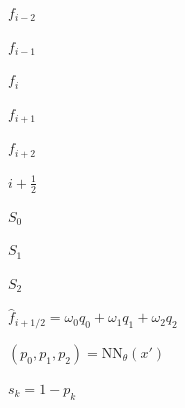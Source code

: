 \documentclass{article}
\begin{document}
\begin{preview}
\hbox{
\color[HTML]{242424}
\fontsize{23}{27.60}\selectfont
$\displaystyle f_{i-2}$
}
\end{preview}
\begin{preview}
\hbox{
\color[HTML]{242424}
\fontsize{23}{27.60}\selectfont
$\displaystyle f_{i-1}$
}
\end{preview}
\begin{preview}
\hbox{
\color[HTML]{242424}
\fontsize{23}{27.60}\selectfont
$\displaystyle f_i$
}
\end{preview}
\begin{preview}
\hbox{
\color[HTML]{242424}
\fontsize{23}{27.60}\selectfont
$\displaystyle f_{i+1}$
}
\end{preview}
\begin{preview}
\hbox{
\color[HTML]{242424}
\fontsize{23}{27.60}\selectfont
$\displaystyle f_{i+2}$
}
\end{preview}
\begin{preview}
\hbox{
\color[HTML]{242424}
\fontsize{17}{20.40}\selectfont
$\displaystyle i+\tfrac{1}{2}$
}
\end{preview}
\begin{preview}
\hbox{
\color[HTML]{242424}
\fontsize{14}{16.80}\selectfont
$\displaystyle S_0$
}
\end{preview}
\begin{preview}
\hbox{
\color[HTML]{595959}
\fontsize{14}{16.80}\selectfont
$\displaystyle S_1$
}
\end{preview}
\begin{preview}
\hbox{
\color[HTML]{242424}
\fontsize{14}{16.80}\selectfont
$\displaystyle S_2$
}
\end{preview}
\begin{preview}
\hbox{
\color[HTML]{242424}
\fontsize{26}{31.20}\selectfont
$\displaystyle \hat f_{i+1/2}=\omega_0q_0+\omega_1q_1+\omega_2q_2$
}
\end{preview}
\begin{preview}
\hbox{
\color[HTML]{242424}
\fontsize{24}{28.80}\selectfont
$\displaystyle (p_0,p_1,p_2)=\mathrm{NN}_{\theta}(x')$
}
\end{preview}
\begin{preview}
\hbox{
\color[HTML]{242424}
\fontsize{24}{28.80}\selectfont
$\displaystyle s_k=1-p_k$
}
\end{preview}
\end{document}

